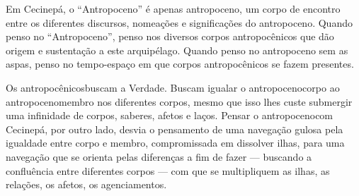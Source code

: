 Em Cecinepá, o \enquote{Antropoceno} é apenas \guillemetleft antropoceno\guillemetright, um corpo de encontro entre os diferentes discursos, nomeações e significações do antropoceno. Quando penso no \enquote{Antropoceno}, penso nos diversos corpos antropocênicos que dão origem e sustentação a este arquipélago. Quando penso no antropoceno sem as aspas, penso no tempo-espaço em que corpos antropocênicos se fazem presentes.

Os \guillemetleft antropocênicos\guillemetright buscam a Verdade. Buscam igualar o \guillemetleft antropoceno\guillemetright corpo ao \guillemetleft antropoceno\guillemetright membro nos diferentes corpos, mesmo que isso lhes custe submergir uma infinidade de corpos, saberes, afetos e laços. Pensar o \guillemetleft antropoceno\guillemetright com Cecinepá, por outro lado, desvia o pensamento de uma navegação gulosa pela igualdade entre corpo e membro, compromissada em dissolver ilhas, para uma navegação que se orienta pelas diferenças a fim de fazer --- buscando a confluência entre diferentes corpos --- com que se multipliquem as ilhas, as relações, os afetos, os agenciamentos.




